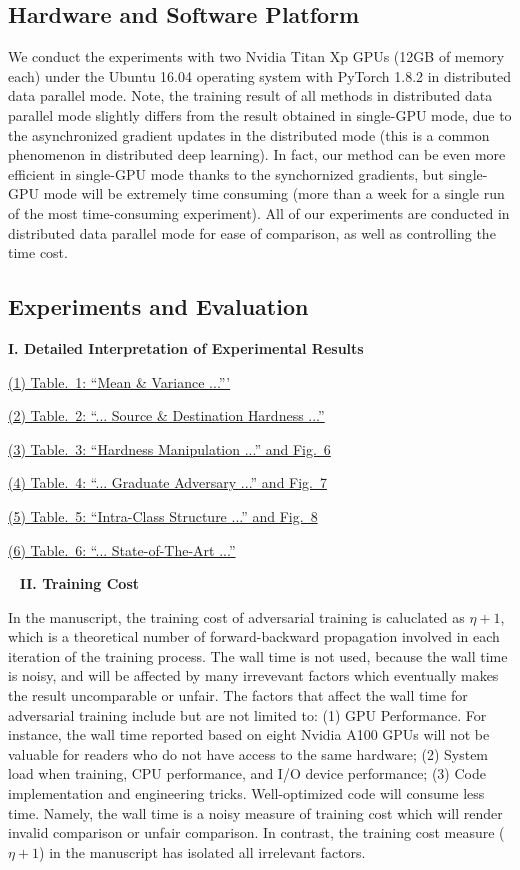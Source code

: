 
\subsection{Hardware and Software Platform}

We conduct the experiments with two Nvidia Titan Xp GPUs (12GB of memory each)
under the Ubuntu 16.04 operating system with PyTorch 1.8.2 in distributed data
parallel mode.
%
Note, the training result of all methods in distributed data parallel mode
slightly differs from the result obtained in single-GPU mode, due to the
asynchronized gradient updates in the distributed mode (this is a common
phenomenon in distributed deep learning).
%
In fact, our method can be even more efficient in single-GPU mode thanks to the
synchornized gradients, but single-GPU mode will be extremely time consuming
(more than a week for a single run of the most time-consuming experiment).
%
All of our experiments are conducted in distributed data parallel mode for ease
of comparison, as well as controlling the time cost.

\subsection{Experiments and Evaluation}

\noindent\textbf{I. Detailed Interpretation of Experimental Results}

\ul{(1) Table.~1: ``Mean \& Variance ...'''}

\ul{(2) Table.~2: ``... Source \& Destination Hardness ...''}

\ul{(3) Table.~3: ``Hardness Manipulation ...'' and Fig.~6}

\ul{(4) Table.~4: ``... Graduate Adversary ...'' and Fig.~7}

\ul{(5) Table.~5: ``Intra-Class Structure ...'' and Fig.~8}

\ul{(6) Table.~6: ``... State-of-The-Art ...''}


~\newline
\noindent\textbf{II. Training Cost}

In the manuscript, the training cost of adversarial training is caluclated as
$\eta+1$, which is a theoretical number of forward-backward propagation
involved in each iteration of the training process.
%
The wall time is not used, because the wall time is noisy, and will be affected
by many irrevevant factors which eventually makes the result uncomparable or
unfair.
%
The factors that affect the wall time for adversarial training include but are
not limited to:
%
(1) GPU Performance. For instance, the wall time reported based on eight Nvidia
A100 GPUs will not be valuable for readers who do not have access to the same
hardware;
%
(2) System load when training, CPU performance, and I/O device performance;
%
(3) Code implementation and engineering tricks. Well-optimized code will
consume less time.
%
Namely, the wall time is a noisy measure of training cost which will render
invalid comparison or unfair comparison.
%
In contrast, the training cost measure ($\eta+1$) in the manuscript has
isolated all irrelevant factors.

